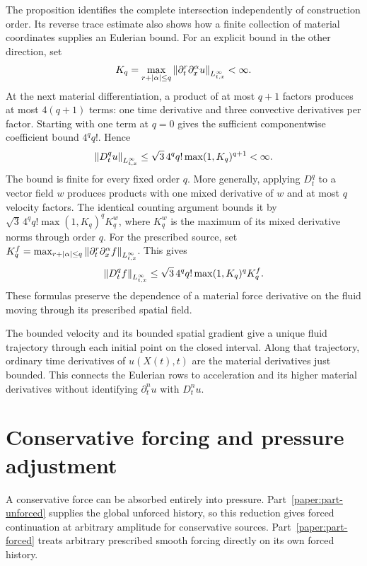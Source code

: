 The proposition identifies the complete intersection independently
of construction order. Its reverse trace estimate also shows how a finite
collection of material coordinates supplies an Eulerian bound.
For an explicit bound in the other direction, set
\[
 K_q=\max_{r+|\alpha|\le q}
 \left\lVert \partial_t^r\partial_x^\alpha u\right\rVert_{L^\infty_{t,x}}<\infty.
\]
At the next material differentiation, a product of at most \(q+1\)
factors produces at most \(4(q+1)\) terms: one time derivative and
three convective derivatives per factor. Starting with one term at \(q=0\)
gives the sufficient componentwise coefficient bound \(4^q q!\). Hence
\begin{equation}
 \left\lVert D_t^q u\right\rVert_{L^\infty_{t,x}}
 \le\sqrt3\,4^q q!\max(1,K_q)^{q+1}<\infty.
 \label{r:eq:material-all}
\end{equation}
The bound is finite for every fixed order \(q\). More generally,
applying \(D_t^q\) to a vector field \(w\)
produces products with one mixed derivative of \(w\) and at most \(q\)
velocity factors. The identical counting argument bounds it by
\(\sqrt3\,4^q q!\max(1,K_q)^qK_q^w\), where \(K_q^w\) is the
maximum of its mixed derivative norms through order \(q\).
For the prescribed source, set
\(K_q^f=\max_{r+|\alpha|\le q}
\left\lVert \partial_t^r\partial_x^\alpha f\right\rVert_{L^\infty_{t,x}}\). This gives
\[
 \left\lVert D_t^q f\right\rVert_{L^\infty_{t,x}}
 \le\sqrt3\,4^q q!\max(1,K_q)^qK_q^f.
\]
These formulas preserve the dependence of a material force derivative on
the fluid moving through its prescribed spatial field.

The bounded velocity and its bounded spatial gradient give a unique fluid
trajectory through each initial point on the closed interval. Along that
trajectory, ordinary time derivatives of \(u(X(t),t)\) are the material
derivatives just bounded. This connects the Eulerian rows to acceleration
and its higher material derivatives without identifying
\(\partial_t^n u\) with \(D_t^n u\).





\section{Conservative forcing and pressure adjustment}

A conservative force can be absorbed entirely into pressure.
Part~\ref{paper:part-unforced} supplies the global unforced history, so this reduction gives forced
continuation at arbitrary amplitude for conservative sources. Part~\ref{paper:part-forced} treats
arbitrary prescribed smooth forcing directly on its own forced history.

